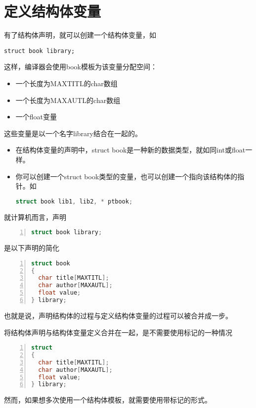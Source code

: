 \section{定义结构体变量}
\begin{frame}[fragile]\ft{\secname}
有了结构体声明，就可以创建一个结构体变量，如
\begin{lstlisting}[basicstyle=\ttfamily]
struct book library;  
\end{lstlisting}
这样，编译器会使用{\tf book}模板为该变量分配空间：
\begin{itemize}
  \item 一个长度为{\tf MAXTITL}的{\tf char}数组
  \item 一个长度为{\tf MAXAUTL}的char数组
  \item 一个{\tf float}变量
\end{itemize}
这些变量是以一个名字{\tf library}结合在一起的。
\end{frame}

\begin{frame}[fragile]\ft{\secname}
  \begin{itemize}
  \item  在结构体变量的声明中，{\tf struct book}是一种新的数据类型，就如同{\tf int}或{\tf float}一样。\\[0.1in]
  \item 你可以创建一个{\tf struct book}类型的变量，也可以创建一个指向该结构体的指针。如
\begin{lstlisting}[language=c,backgroundcolor=\color{red!20}]
struct book lib1, lib2, * ptbook;  
\end{lstlisting}
  \end{itemize}
\end{frame}

\begin{frame}[fragile]\ft{\secname}

就计算机而言，声明
\begin{lstlisting}[language=c,numbers=left,frame=single]
struct book library;  
\end{lstlisting}
是以下声明的简化
\begin{lstlisting}[language=c,numbers=left,frame=single]
struct book
{
  char title[MAXTITL];
  char author[MAXAUTL];
  float value;
} library;  
\end{lstlisting}
也就是说，声明结构体的过程与定义结构体变量的过程可以被合并成一步。
\end{frame}

\begin{frame}[fragile]\ft{\secname}

将结构体声明与结构体变量定义合并在一起，是不需要使用标记的一种情况
\begin{lstlisting}[language=c,numbers=left,frame=single]
struct 
{
  char title[MAXTITL];
  char author[MAXAUTL];
  float value;
} library;  
\end{lstlisting}
然而，如果想多次使用一个结构体模板，就需要使用带标记的形式。
\end{frame}


